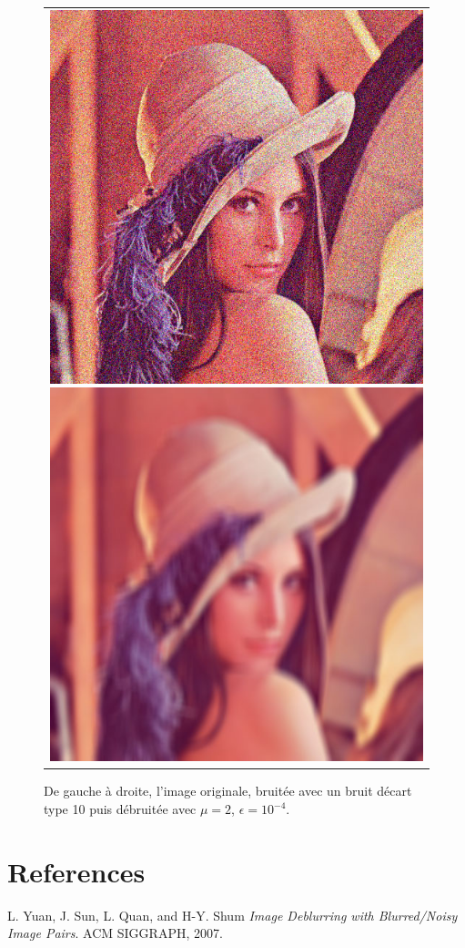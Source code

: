 \documentclass{article}
\begin{document}
\begin{figure}[ht]
\begin{center}\begin{tabular}{c}	
	\includegraphics[scale=0.4]{images/lena_noisy.jpg}
	\includegraphics[scale=0.4]{images/lena_blurred.jpg}
\end{tabular}
	\caption{De gauche à droite, l'image originale, bruitée avec un bruit décart type 10 puis débruitée avec $\mu = 2$, $\epsilon = 10^{-4}$.}\label{surfplot}\end{center}
\end{figure}

\section{References}

\begin{thebibliography}{9}

	L. Yuan, J. Sun, L. Quan, and H-Y. Shum
	\emph{Image Deblurring with Blurred/Noisy Image Pairs}.
	ACM SIGGRAPH,
	2007. 


\end{thebibliography}
\end{document}
